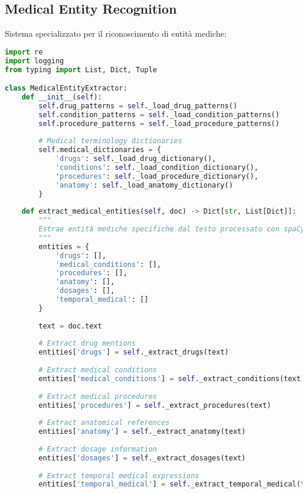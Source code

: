 \documentclass[12pt,a4paper]{report}
\begin{document}
\subsection{Medical Entity Recognition}

Sistema specializzato per il riconoscimento di entità mediche:

\begin{lstlisting}[language=Python, caption=Medical Entity Extractor]
import re
import logging
from typing import List, Dict, Tuple

class MedicalEntityExtractor:
    def __init__(self):
        self.drug_patterns = self._load_drug_patterns()
        self.condition_patterns = self._load_condition_patterns()
        self.procedure_patterns = self._load_procedure_patterns()
        
        # Medical terminology dictionaries
        self.medical_dictionaries = {
            'drugs': self._load_drug_dictionary(),
            'conditions': self._load_condition_dictionary(),
            'procedures': self._load_procedure_dictionary(),
            'anatomy': self._load_anatomy_dictionary()
        }
    
    def extract_medical_entities(self, doc) -> Dict[str, List[Dict]]:
        """
        Estrae entità mediche specifiche dal testo processato con spaCy
        """
        entities = {
            'drugs': [],
            'medical_conditions': [],
            'procedures': [],
            'anatomy': [],
            'dosages': [],
            'temporal_medical': []
        }
        
        text = doc.text
        
        # Extract drug mentions
        entities['drugs'] = self._extract_drugs(text)
        
        # Extract medical conditions
        entities['medical_conditions'] = self._extract_conditions(text)
        
        # Extract medical procedures
        entities['procedures'] = self._extract_procedures(text)
        
        # Extract anatomical references
        entities['anatomy'] = self._extract_anatomy(text)
        
        # Extract dosage information
        entities['dosages'] = self._extract_dosages(text)
        
        # Extract temporal medical expressions
        entities['temporal_medical'] = self._extract_temporal_medical(text)
        

\end{lstlisting}
\end{document}
